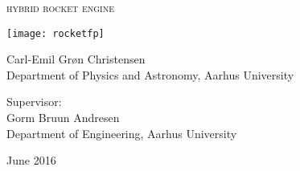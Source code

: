 
\begin{titlingpage}

\begin{center}

\vspace*{0cm}
\huge
\textsc{hybrid rocket engine}\\
\vspace{1.5cm}

\texttt{[image: rocketfp]}
\vspace{1.5cm}

\large
{
    Carl-Emil Grøn Christensen\\
    Department of Physics and Astronomy, Aarhus University
}

\vspace{1.5cm}

{
  Supervisor:\\
  Gorm Bruun Andresen\\
  Department of Engineering, Aarhus University
}

\vspace{1.5cm}
{June 2016}\\


\end{center}



\end{titlingpage}
